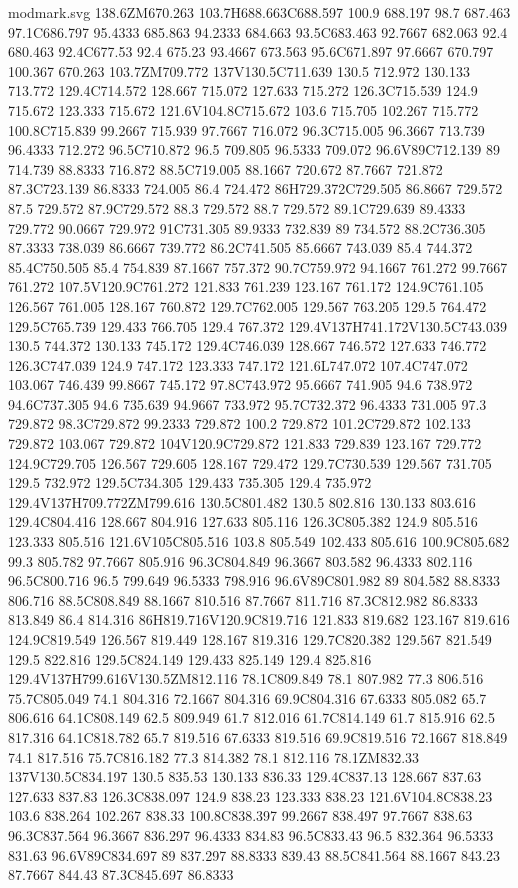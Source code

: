 \begin{filecontents}[noheader]{modmark.svg}
138.6ZM670.263 103.7H688.663C688.597 100.9 688.197 98.7 687.463 97.1C686.797 95.4333 685.863 94.2333 684.663 93.5C683.463 92.7667 682.063 92.4 680.463 92.4C677.53 92.4 675.23 93.4667 673.563 95.6C671.897 97.6667 670.797 100.367 670.263 103.7ZM709.772 137V130.5C711.639 130.5 712.972 130.133 713.772 129.4C714.572 128.667 715.072 127.633 715.272 126.3C715.539 124.9 715.672 123.333 715.672 121.6V104.8C715.672 103.6 715.705 102.267 715.772 100.8C715.839 99.2667 715.939 97.7667 716.072 96.3C715.005 96.3667 713.739 96.4333 712.272 96.5C710.872 96.5 709.805 96.5333 709.072 96.6V89C712.139 89 714.739 88.8333 716.872 88.5C719.005 88.1667 720.672 87.7667 721.872 87.3C723.139 86.8333 724.005 86.4 724.472 86H729.372C729.505 86.8667 729.572 87.5 729.572 87.9C729.572 88.3 729.572 88.7 729.572 89.1C729.639 89.4333 729.772 90.0667 729.972 91C731.305 89.9333 732.839 89 734.572 88.2C736.305 87.3333 738.039 86.6667 739.772 86.2C741.505 85.6667 743.039 85.4 744.372 85.4C750.505 85.4 754.839 87.1667 757.372 90.7C759.972 94.1667 761.272 99.7667 761.272 107.5V120.9C761.272 121.833 761.239 123.167 761.172 124.9C761.105 126.567 761.005 128.167 760.872 129.7C762.005 129.567 763.205 129.5 764.472 129.5C765.739 129.433 766.705 129.4 767.372 129.4V137H741.172V130.5C743.039 130.5 744.372 130.133 745.172 129.4C746.039 128.667 746.572 127.633 746.772 126.3C747.039 124.9 747.172 123.333 747.172 121.6L747.072 107.4C747.072 103.067 746.439 99.8667 745.172 97.8C743.972 95.6667 741.905 94.6 738.972 94.6C737.305 94.6 735.639 94.9667 733.972 95.7C732.372 96.4333 731.005 97.3 729.872 98.3C729.872 99.2333 729.872 100.2 729.872 101.2C729.872 102.133 729.872 103.067 729.872 104V120.9C729.872 121.833 729.839 123.167 729.772 124.9C729.705 126.567 729.605 128.167 729.472 129.7C730.539 129.567 731.705 129.5 732.972 129.5C734.305 129.433 735.305 129.4 735.972 129.4V137H709.772ZM799.616 130.5C801.482 130.5 802.816 130.133 803.616 129.4C804.416 128.667 804.916 127.633 805.116 126.3C805.382 124.9 805.516 123.333 805.516 121.6V105C805.516 103.8 805.549 102.433 805.616 100.9C805.682 99.3 805.782 97.7667 805.916 96.3C804.849 96.3667 803.582 96.4333 802.116 96.5C800.716 96.5 799.649 96.5333 798.916 96.6V89C801.982 89 804.582 88.8333 806.716 88.5C808.849 88.1667 810.516 87.7667 811.716 87.3C812.982 86.8333 813.849 86.4 814.316 86H819.716V120.9C819.716 121.833 819.682 123.167 819.616 124.9C819.549 126.567 819.449 128.167 819.316 129.7C820.382 129.567 821.549 129.5 822.816 129.5C824.149 129.433 825.149 129.4 825.816 129.4V137H799.616V130.5ZM812.116 78.1C809.849 78.1 807.982 77.3 806.516 75.7C805.049 74.1 804.316 72.1667 804.316 69.9C804.316 67.6333 805.082 65.7 806.616 64.1C808.149 62.5 809.949 61.7 812.016 61.7C814.149 61.7 815.916 62.5 817.316 64.1C818.782 65.7 819.516 67.6333 819.516 69.9C819.516 72.1667 818.849 74.1 817.516 75.7C816.182 77.3 814.382 78.1 812.116 78.1ZM832.33 137V130.5C834.197 130.5 835.53 130.133 836.33 129.4C837.13 128.667 837.63 127.633 837.83 126.3C838.097 124.9 838.23 123.333 838.23 121.6V104.8C838.23 103.6 838.264 102.267 838.33 100.8C838.397 99.2667 838.497 97.7667 838.63 96.3C837.564 96.3667 836.297 96.4333 834.83 96.5C833.43 96.5 832.364 96.5333 831.63 96.6V89C834.697 89 837.297 88.8333 839.43 88.5C841.564 88.1667 843.23 87.7667 844.43 87.3C845.697 86.8333 
\end{filecontents}
